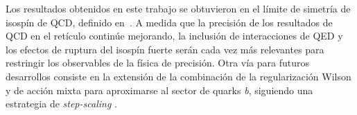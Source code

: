 Los resultados obtenidos en este trabajo se obtuvieron en el límite de simetría de isospín de QCD, definido en~\citep{FlavourLatticeAveragingGroupFLAG:2021npn}. A medida que la precisión de los resultados de QCD en el retículo continúe mejorando, la inclusión de interacciones de QED y los efectos de ruptura del isospín fuerte serán cada vez más relevantes para restringir los observables de la física de precisión. Otra vía para futuros desarrollos consiste en la extensión de la combinación de la regularización Wilson y de acción mixta para aproximarse al sector de quarks \textit{b}, siguiendo una estrategia de \textit{step-scaling} \cite{Sommer:2023gap}.



